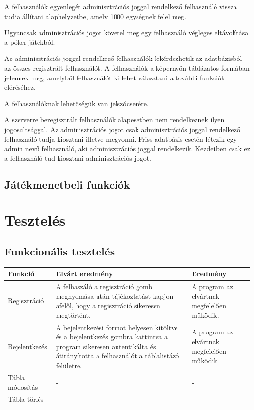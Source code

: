 A felhasználók egyenlegét adminisztrációs joggal rendelkező felhasználó vissza tudja állítani alaphelyzetbe, amely 1000 egységnek felel meg.

Ugyancsak adminisztrációs jogot követel meg egy felhasználó végleges eltávolítása a póker játékból.

Az adminisztrációs joggal rendelkező felhasználók lekérdezhetik az adatbázisból az összes regisztrált felhasználót. A felhasználók a képernyőn táblázatos formában jelennek meg, amelyből felhasználót ki lehet választani a további funkciók eléréséhez.

A felhasználóknak lehetőségük van jelszócserére.

A szerverre beregisztrált felhasználók alapesetben nem rendelkeznek ilyen jogosultsággal. Az adminisztrációs jogot csak adminisztrációs joggal rendelkező felhasználó tudja kiosztani illetve megvonni. Friss adatbázis esetén létezik egy admin nevű felhasználó, aki adminisztrációs joggal rendelkezik. Kezdetben csak ez a felhasználó tud kiosztani adminisztrációs jogot.

\subsection{Játékmenetbeli funkciók}

\section{Tesztelés}
\subsection{Funkcionális tesztelés}
\begin{tabular}{| C{4.7cm} | C{4.7cm} | C{4.7cm} |}
\hline
  Funkció & Elvárt eredmény & Eredmény \\ \hline
  Regisztráció & A felhaszáló a regisztráció gomb megnyomása után tájékoztatást kapjon afelől, hogy a regisztráció sikeresen megtörtént. & A program az elvártnak megfelelően működik. \\ \hline
  Bejelentkezés & A bejelentkezési formot helyesen kitöltve és a bejelentkezés gombra kattintva a program sikeresen autentikálta és átirányította a felhasználót a táblalistázó felületre. & A program az elvártnak megfelelően működik  \\ \hline
  Tábla módosítás & - & - \\ \hline
  Tábla törlés & - & - \\ \hline
\end{tabular}

